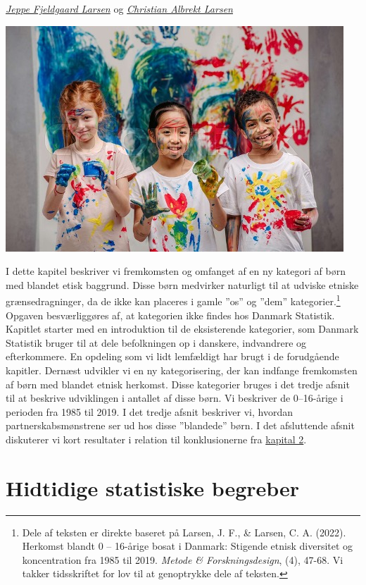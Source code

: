 \documentclass[
]{book}
\begin{document}
\emph{\href{https://vbn.aau.dk/da/persons/jeppefl}{Jeppe Fjeldgaard Larsen}} og \emph{\href{https://vbn.aau.dk/en/persons/albrekt}{Christian Albrekt Larsen}}

\includegraphics[width=1\linewidth]{images/kap3}

\newpage

I dette kapitel beskriver vi fremkomsten og omfanget af en ny kategori af børn med blandet etisk baggrund. Disse børn medvirker naturligt til at udviske etniske grænsedragninger, da de ikke kan placeres i gamle ''os'' og ''dem'' kategorier.\footnote{Dele af teksten er direkte baseret på Larsen, J. F., \& Larsen, C. A. (2022). Herkomst blandt 0 -- 16-årige bosat i Danmark: Stigende etnisk diversitet og koncentration fra 1985 til 2019. \emph{Metode \& Forskningsdesign}, (4), 47-68. Vi takker tidsskriftet for lov til at genoptrykke dele af teksten.} Opgaven besværliggøres af, at kategorien ikke findes hos Danmark Statistik. Kapitlet starter med en introduktion til de eksisterende kategorier, som Danmark Statistik bruger til at dele befolkningen op i danskere, indvandrere og efterkommere. En opdeling som vi lidt lemfældigt har brugt i de forudgående kapitler. Dernæst udvikler vi en ny kategorisering, der kan indfange fremkomsten af børn med blandet etnisk herkomst. Disse kategorier bruges i det tredje afsnit til at beskrive udviklingen i antallet af disse børn. Vi beskriver de 0--16-årige i perioden fra 1985 til 2019. I det tredje afsnit beskriver vi, hvordan partnerskabsmønstrene ser ud hos disse ''blandede'' børn. I det afsluttende afsnit diskuterer vi kort resultater i relation til konklusionerne fra \hyperref[kap2]{kapital 2}.

\section{Hidtidige statistiske begreber}\label{hidtidige-statistiske-begreber}
\end{document}
